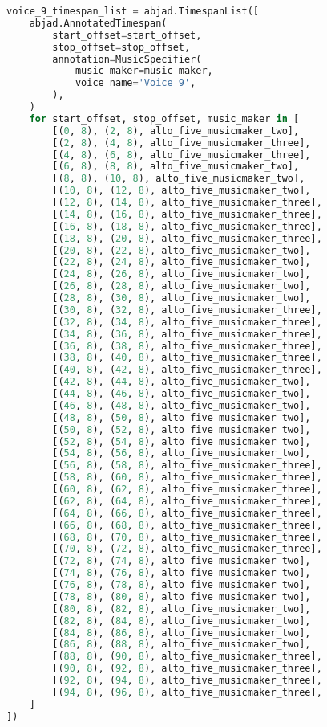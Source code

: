 \begin{lstlisting}[language=Python, caption=Invocation Source Code]
voice_9_timespan_list = abjad.TimespanList([
    abjad.AnnotatedTimespan(
        start_offset=start_offset,
        stop_offset=stop_offset,
        annotation=MusicSpecifier(
            music_maker=music_maker,
            voice_name='Voice 9',
        ),
    )
    for start_offset, stop_offset, music_maker in [
        [(0, 8), (2, 8), alto_five_musicmaker_two],
        [(2, 8), (4, 8), alto_five_musicmaker_three],
        [(4, 8), (6, 8), alto_five_musicmaker_three],
        [(6, 8), (8, 8), alto_five_musicmaker_two],
        [(8, 8), (10, 8), alto_five_musicmaker_two],
        [(10, 8), (12, 8), alto_five_musicmaker_two],
        [(12, 8), (14, 8), alto_five_musicmaker_three],
        [(14, 8), (16, 8), alto_five_musicmaker_three],
        [(16, 8), (18, 8), alto_five_musicmaker_three],
        [(18, 8), (20, 8), alto_five_musicmaker_three],
        [(20, 8), (22, 8), alto_five_musicmaker_two],
        [(22, 8), (24, 8), alto_five_musicmaker_two],
        [(24, 8), (26, 8), alto_five_musicmaker_two],
        [(26, 8), (28, 8), alto_five_musicmaker_two],
        [(28, 8), (30, 8), alto_five_musicmaker_two],
        [(30, 8), (32, 8), alto_five_musicmaker_three],
        [(32, 8), (34, 8), alto_five_musicmaker_three],
        [(34, 8), (36, 8), alto_five_musicmaker_three],
        [(36, 8), (38, 8), alto_five_musicmaker_three],
        [(38, 8), (40, 8), alto_five_musicmaker_three],
        [(40, 8), (42, 8), alto_five_musicmaker_three],
        [(42, 8), (44, 8), alto_five_musicmaker_two],
        [(44, 8), (46, 8), alto_five_musicmaker_two],
        [(46, 8), (48, 8), alto_five_musicmaker_two],
        [(48, 8), (50, 8), alto_five_musicmaker_two],
        [(50, 8), (52, 8), alto_five_musicmaker_two],
        [(52, 8), (54, 8), alto_five_musicmaker_two],
        [(54, 8), (56, 8), alto_five_musicmaker_two],
        [(56, 8), (58, 8), alto_five_musicmaker_three],
        [(58, 8), (60, 8), alto_five_musicmaker_three],
        [(60, 8), (62, 8), alto_five_musicmaker_three],
        [(62, 8), (64, 8), alto_five_musicmaker_three],
        [(64, 8), (66, 8), alto_five_musicmaker_three],
        [(66, 8), (68, 8), alto_five_musicmaker_three],
        [(68, 8), (70, 8), alto_five_musicmaker_three],
        [(70, 8), (72, 8), alto_five_musicmaker_three],
        [(72, 8), (74, 8), alto_five_musicmaker_two],
        [(74, 8), (76, 8), alto_five_musicmaker_two],
        [(76, 8), (78, 8), alto_five_musicmaker_two],
        [(78, 8), (80, 8), alto_five_musicmaker_two],
        [(80, 8), (82, 8), alto_five_musicmaker_two],
        [(82, 8), (84, 8), alto_five_musicmaker_two],
        [(84, 8), (86, 8), alto_five_musicmaker_two],
        [(86, 8), (88, 8), alto_five_musicmaker_two],
        [(88, 8), (90, 8), alto_five_musicmaker_three],
        [(90, 8), (92, 8), alto_five_musicmaker_three],
        [(92, 8), (94, 8), alto_five_musicmaker_three],
        [(94, 8), (96, 8), alto_five_musicmaker_three],
    ]
])


\end{lstlisting}
